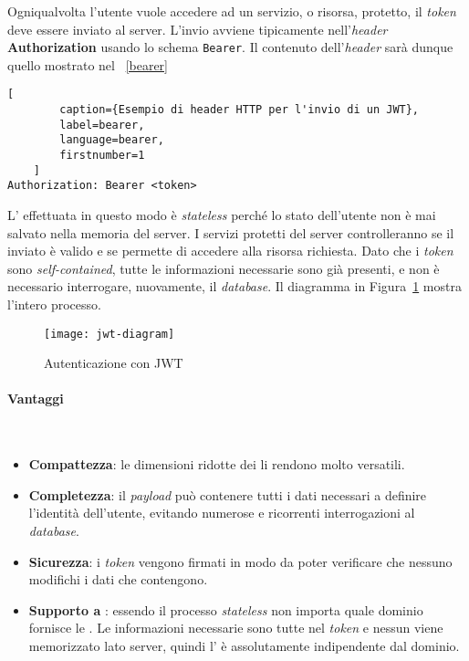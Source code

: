 Ogniqualvolta l'utente vuole accedere ad un servizio, o risorsa, protetto, il \textit{token} deve essere inviato al server. L'invio avviene tipicamente nell'\textit{header} \textbf{Authorization} usando lo schema \texttt{Bearer}. Il contenuto dell'\textit{header} sarà dunque quello mostrato nel \lstlistingname~\ref{bearer}
\begin{lstlisting}[
		caption={Esempio di header HTTP per l'invio di un JWT},
		label=bearer,
		language=bearer,
		firstnumber=1
	]
Authorization: Bearer <token>
\end{lstlisting}
L' effettuata in questo modo è \textit{stateless} perché lo stato dell'utente non è mai salvato nella memoria del server. I servizi protetti del server controlleranno se il  inviato è valido e se permette di accedere alla risorsa richiesta. Dato che i \textit{token}  sono \textit{self-contained}, tutte le informazioni necessarie sono già presenti, e non è necessario interrogare, nuovamente, il \textit{database}. Il diagramma in Figura~\ref{fig:jwtdiagram} mostra l'intero processo.
\begin{figure}[h]
  \begin{center}
    \texttt{[image: jwt-diagram]}
  \caption[Autenticazione con JWT]{Autenticazione con JWT\protect\footnotemark}
  \label{fig:jwtdiagram}
  \end{center} 
\end{figure}

\paragraph{Vantaggi} \mbox{} \\
\begin{itemize}
\item \textbf{Compattezza}: le dimensioni ridotte dei  li rendono molto versatili.
\item \textbf{Completezza}: il \textit{payload} può contenere tutti i dati necessari a definire l'identità dell'utente, evitando numerose e ricorrenti interrogazioni al \textit{database}.
\item \textbf{Sicurezza}: i \textit{token} vengono firmati in modo da poter verificare che nessuno modifichi i dati che contengono.
\item \textbf{Supporto a }: essendo il processo \textit{stateless} non importa quale dominio fornisce le . Le informazioni necessarie sono tutte nel \textit{token} e nessun  viene memorizzato lato server, quindi l' è assolutamente indipendente dal dominio.
\end{itemize}

